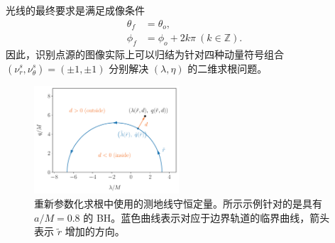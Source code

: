 \documentclass[aps,reprint,superscriptaddress,nofootinbib,floatfix,longbibliography,preprintnumbers]{revtex4-1}
\begin{document}
光线的最终要求是满足成像条件
   \begin{equation}
\begin{aligned}
    \theta_f &= \theta_o,  \\  
    \phi_f &= \phi_o + 2k\pi \  (k\in\mathbb{Z}).
\end{aligned}
\label{eq:imaging condition}
\end{equation}    因此，识别点源的图像实际上可以归结为针对四种动量符号组合    $(\nu_r^s, \nu_{\theta}^s) = (\pm 1, \pm 1)$    分别解决    $(\lambda, \eta)$    的二维求根问题。  

   \begin{figure}[h]
    \centering
    \includegraphics[width=0.48\textwidth]{figures/rc_d_parameterization.pdf}
    \caption{重新参数化求根中使用的测地线守恒定量。所示示例针对的是具有    $a/M = 0.8$    的 BH。蓝色曲线表示对应于边界轨道的临界曲线，箭头表示    $\tilde{r}$    增加的方向。  }
    \label{fig:rc_d parameterization}
\end{figure}     
\end{document}
